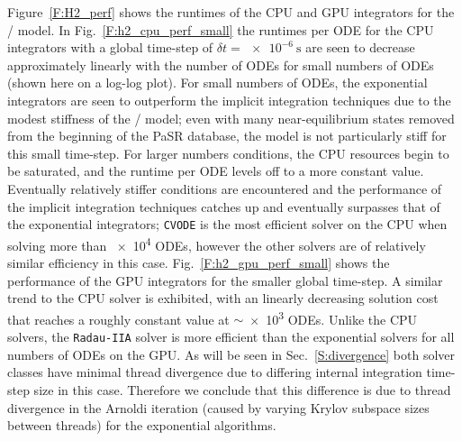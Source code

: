 \documentclass[final,twocolumn]{elsarticle}
\begin{document}
Figure~\ref{F:H2_perf} shows the runtimes of the CPU and GPU integrators for the \slash{} model.
In Fig.~\ref{F:h2_cpu_perf_small} the runtimes per ODE for the CPU integrators with a global time-step of $\delta t= \SI{e-6}{\second}$ are seen to decrease approximately linearly with the number of ODEs for small numbers of ODEs (shown here on a log-log plot).
For small numbers of ODEs, the exponential integrators are seen to outperform the implicit integration techniques due to the modest stiffness of the \slash{} model; even with many near-equilibrium states removed from the beginning of the PaSR database, the model is not particularly stiff for this small time-step.
For larger numbers conditions, the CPU resources begin to be saturated, and the runtime per ODE levels off to a more constant value.
Eventually relatively stiffer conditions are encountered and the performance of the implicit integration techniques catches up and eventually surpasses that of the exponential integrators; \texttt{CVODE} is the most efficient solver on the CPU when solving more than \num{e4} ODEs, however the other solvers are of relatively similar efficiency in this case.
Fig.~\ref{F:h2_gpu_perf_small} shows the performance of the GPU integrators for the smaller global time-step.
A similar trend to the CPU solver is exhibited, with an linearly decreasing solution cost that reaches a roughly constant value at $\sim$\num{e3} ODEs.
Unlike the CPU solvers, the \texttt{Radau-IIA} solver is more efficient than the exponential solvers for all numbers of ODEs on the GPU.
As will be seen in Sec.~\ref{S:divergence} both solver classes have minimal thread divergence due to differing internal integration time-step size in this case.
Therefore we conclude that this difference is due to thread divergence in the Arnoldi iteration (caused by varying Krylov subspace sizes between threads) for the exponential algorithms.
\end{document}
